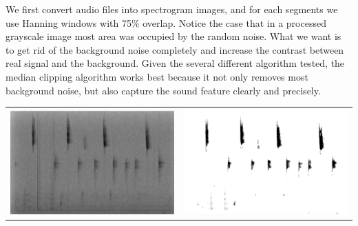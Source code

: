 We first convert audio files into spectrogram images, and for each segments we use Hanning windows with 75\% overlap. Notice the case that in a processed grayscale image most area was occupied by the random noise. What we want is to get rid of the background noise completely and increase the contrast between real signal and the background. Given the several different algorithm tested, the median clipping algorithm works best because it not only removes most background noise, but also capture the sound feature clearly and precisely.

\begin{center}
\begin{tabular}{cc}
\begin{minipage}{1.8truein}
\includegraphics[height=1truein]{images/original}
\end{minipage}&
\begin{minipage}{1.8truein}
\includegraphics[height=1truein]{images/Median_clipped}

\end{minipage}
\end{tabular}
\end{center}
